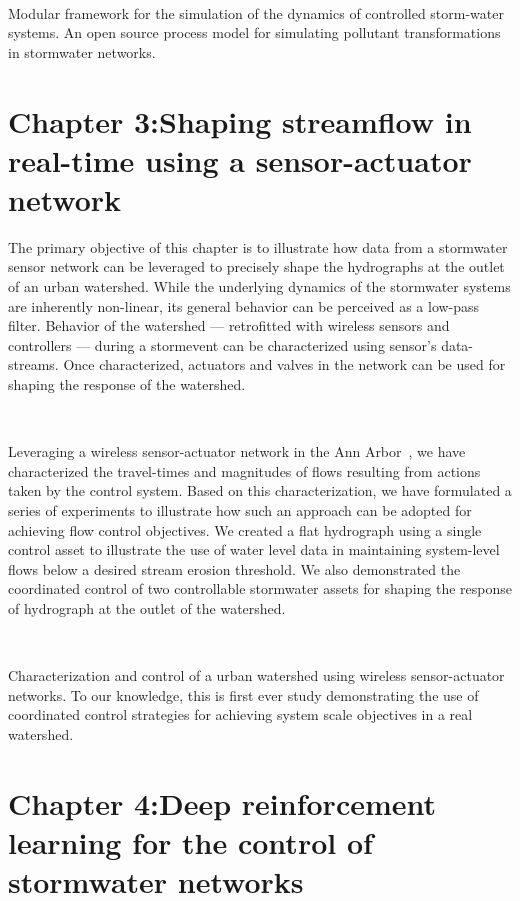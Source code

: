 \

Modular framework for the simulation of the dynamics of controlled storm-water systems.
An open source process model for simulating pollutant transformations in stormwater networks.

\section{Chapter 3:Shaping streamflow in real-time using a sensor-actuator network}

The primary objective of this chapter is to illustrate how data from a stormwater sensor network can be leveraged to precisely shape the hydrographs at the outlet of an urban watershed.
While the underlying dynamics of the stormwater systems are inherently non-linear, its general behavior can be perceived as a low-pass filter.
Behavior of the watershed --- retrofitted with wireless sensors and controllers --- during a stormevent can be characterized using sensor's data-streams.
Once characterized, actuators and valves in the network can be used for shaping the response of the watershed.

\

Leveraging a wireless sensor-actuator network in the Ann Arbor~\cite{Bartos_2018}, we have characterized the travel-times and magnitudes of flows resulting from actions taken by the control system.
Based on this characterization, we have formulated a series of experiments to illustrate how such an approach can be adopted for achieving flow control objectives.
We created a flat hydrograph using a single control asset to illustrate the use of water level data in maintaining system-level flows below a desired stream erosion threshold.
We also demonstrated the coordinated control of two controllable stormwater assets for shaping the response of hydrograph at the outlet of the watershed.

\

Characterization and control of a urban watershed using wireless sensor-actuator networks.
To our knowledge, this is first ever study demonstrating the use of coordinated control strategies for achieving system scale objectives in a real watershed.

\section{Chapter 4:Deep reinforcement learning for the control of stormwater networks}

